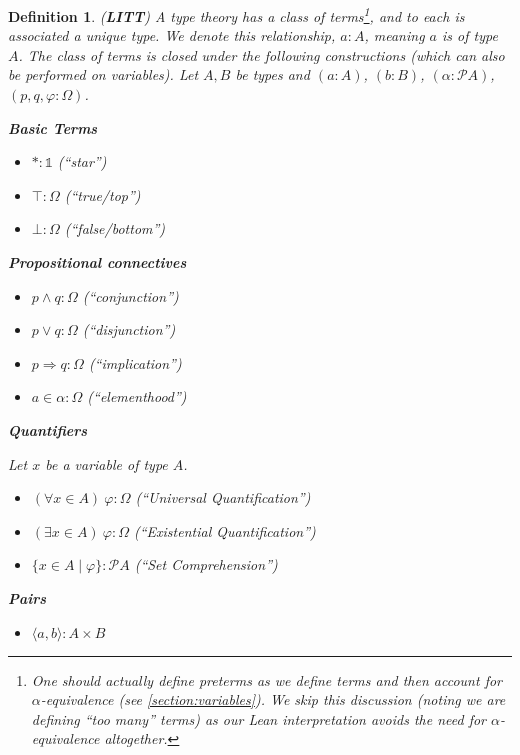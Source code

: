 \documentclass[12pt,leqno]{article}
\theoremstyle{example}
\newtheorem{definition}[theorem]{Definition}
\numberwithin{equation}{section}
\begin{document}
\begin{definition}(\textbf{LITT})
  \label{LSterm}
  A type theory has a class of \emph{terms}\footnote{One should actually define \emph{preterms} as we define \emph{terms} and then account for $\alpha$-equivalence (see \ref{section:variables}). We skip this discussion (noting we are defining ``too many'' terms) as our Lean interpretation avoids the need for $\alpha$-equivalence altogether.}, and to each is associated a unique \emph{type}. We denote this relationship, $a : A$, meaning $a$ is of type $A$. The class of terms is closed under the following constructions (which can also be performed on variables). Let $A, B$ be types and $(a : A)$, $(b : B)$, $(\alpha : \mathscr{P} A)$, $(p, q, \varphi : \Omega)$.
  \setlength{\columnsep}{-3cm}
  \begin{multicols}{2}
    {\large\textbf{Basic Terms}}
    \begin{itemize}
      \item $\ast : \mathds{1}$ (``star'')
      \item $\top : \Omega$ (``true/top'')
      \item $\bot : \Omega$ (``false/bottom'')
    \end{itemize}
    
    {\large\textbf{Propositional connectives}}~
    \begin{itemize}
      \item $p \wedge q : \Omega$ (``conjunction'')
      \item $p \vee q : \Omega$ (``disjunction'')
      \item $p \Rightarrow q : \Omega$ (``implication'')
      \item $a \in \alpha : \Omega$ (``elementhood'')
    \end{itemize}

    \columnbreak
    
    {\large\textbf{Quantifiers}}~

    Let $x$ be a variable of type $A$.
    \begin{itemize}
      \item $(\forall x \in A)~\varphi : \Omega$ (``Universal Quantification'')
      \item $(\exists x \in A)~\varphi : \Omega$ (``Existential Quantification'')
      \item $\{x \in A \mid \varphi\} : \mathscr{P} A$ (``Set Comprehension'')
    \end{itemize}
    
    {\large\textbf{Pairs}}
    \begin{itemize}
      \item $\langle a, b \rangle : A \times B$
    \end{itemize}
  \end{multicols}
\end{definition}
\end{document}
